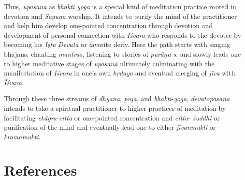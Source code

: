 Thus, \emph{upāsanā} as \emph{bhakti} \emph{yoga} is a special kind of meditation practice rooted in devotion and \emph{Saguṇa} worship. It intends to purify the mind of the practitioner and help him develop one-pointed concentration through devotion and development of personal connection with \emph{Īśvara} who responds to the devotee by becoming his \emph{Iṣṭa} \emph{Devatā} or favorite deity. Here the path starts with singing bhajans, chanting \emph{mantras}, listening to stories of \emph{purāṇa-s}, and slowly leads one to higher meditative stages of \emph{upāsanā} ultimately culminating with the manifestation of \emph{Īśvara} in one's own \emph{hṛdaya} and eventual merging of \emph{jīva} with \emph{Īśvara}.

Through these three streams of \emph{dhyāna}, \emph{pūjā}, and \emph{bhakti}-\emph{yoga}, \emph{devatopāsana} intends to take a spiritual practitioner to higher practices of meditation by facilitating \emph{ekāgra}-\emph{citta} or one-pointed concentration and \emph{citta}- \emph{śuddhi} or purification of the mind and eventually lead one to either \emph{jīvanmukti} or \emph{kramamukti}.

\section*{References}

